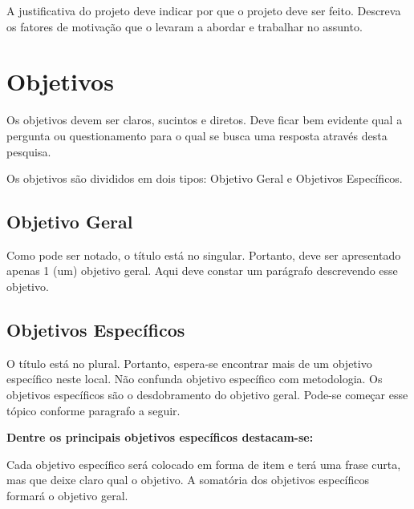\documentclass[
    12pt,               %
    a4paper,            %
    english,            %
    brazil,             %
    ]{article}
\begin{document}
A justificativa do projeto deve indicar por que o projeto deve ser feito. Descreva os fatores de motivação que o levaram a abordar
e trabalhar no assunto.

\section{Objetivos}



Os objetivos devem ser claros, sucintos e diretos. Deve ficar bem evidente qual a pergunta ou questionamento para o qual se busca uma resposta através desta pesquisa.

Os objetivos são divididos em dois tipos: Objetivo Geral e Objetivos Específicos.

\subsection{Objetivo Geral}

Como pode ser notado, o título está no singular. Portanto, deve ser apresentado apenas 1 (um) objetivo geral. Aqui deve constar um parágrafo descrevendo esse objetivo.

\subsection{Objetivos Específicos}

O título está no plural. Portanto, espera-se encontrar mais de um objetivo específico neste local. Não confunda objetivo específico com metodologia.
Os objetivos específicos são o desdobramento do objetivo geral. Pode-se começar esse tópico conforme paragrafo a seguir.

{\bf Dentre os principais objetivos específicos destacam-se: }

Cada objetivo específico será colocado em forma de item e terá uma frase curta, mas que deixe claro qual o objetivo.
A somatória dos objetivos específicos formará o objetivo geral.


\end{document}
